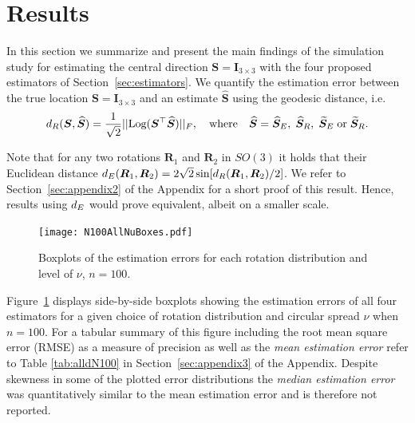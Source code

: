 \section{Results}\label{sec:results}

In this section we summarize and present the main findings of the simulation study for  estimating the central direction $\bm S = \bm I_{3\times 3}$ with the four proposed estimators of Section~\ref{sec:estimators}. We quantify the estimation error between the true location $\bm S = \bm I_{3\times 3}$ and an estimate $\widehat{\bm S}$ using the geodesic distance, i.e.  
\begin{equation}
{d_R}(\bm{S}, \widehat{\bm{S}}) =  \frac{1}{\sqrt{2}}||
\text{Log}(\bm{S}^\top\widehat{\bm{S}})||_F, \quad \mbox{where} \quad \widehat{\bm{S}} =  {\widehat{\bm S}_E}, \; {\widehat{\bm S}_R},\;  {\widetilde{\bm S}_E} \; \mbox{or} \; {\widetilde{\bm S}_R}.
\end{equation}

\noindent Note that for any two rotations $\bm R_1$ and $\bm R_2$ in $SO(3)$ it holds that their Euclidean distance ${d_E}(\bm R_1,\bm R_2)=2\sqrt{2}\sin[{d_R}(\bm R_1,\bm R_2)/2]$. We refer to Section~\ref{sec:appendix2} of the Appendix for a short proof of this result.  Hence, results using ${d_E}$ would prove equivalent, albeit on a smaller scale.   
\begin{figure}[h!]
\centering
\texttt{[image: N100AllNuBoxes.pdf]}
\caption{Boxplots of the estimation errors for each rotation distribution and level of $\nu$,  $n=100$.}
\label{fig:NuBoxes}
\end{figure}
Figure~\ref{fig:NuBoxes} displays side-by-side boxplots showing the estimation errors of all four estimators for a given choice of rotation distribution and circular spread $\nu$ when  $n=100$.  For a tabular summary of this figure including the root mean square error (RMSE) as a measure of precision as well as the \textit{mean estimation error} refer to Table \ref{tab:alldN100} in Section~\ref{sec:appendix3} of the Appendix. Despite skewness in some of the plotted error distributions the \textit{median estimation error} was quantitatively similar to the mean estimation error and is therefore not reported.


